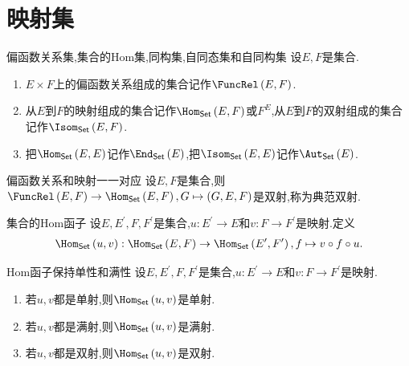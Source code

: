 \section{映射集}

\begin{definition}{偏函数关系集,集合的Hom集,同构集,自同态集和自同构集}{}
	设$E,F$是集合.
	\begin{enumerate}
		\item $E\times F$上的偏函数关系组成的集合记作$\FuncRel\left(E,F\right)$.
		\item 从$E$到$F$的映射组成的集合记作$\Hom_{\mathsf{Set}}\left(E,F\right)$或$F^{E}$,从$E$到$F$的双射组成的集合记作$\Isom_{\mathsf{Set}}\left(E,F\right)$.
		\item 把$\Hom_{\mathsf{Set}}\left(E,E\right)$记作$\End_{\mathsf{Set}}\left(E\right)$,把$\Isom_{\mathsf{Set}}\left(E,E\right)$记作$\Aut_{\mathsf{Set}}\left(E\right)$.
	\end{enumerate}
\end{definition}

\begin{proposition}{偏函数关系和映射一一对应}{}
	设$E,F$是集合,则$\FuncRel\left(E,F\right)\to\Hom_{\mathsf{Set}}\left(E,F\right),G\mapsto\left(G,E,F\right)$是双射,称为典范双射.
\end{proposition}

\begin{definition}{集合的Hom函子}{}
	设$E,E^{\prime},F,F^{\prime}$是集合,$u:E^{\prime}\to E$和$v:F\to F^{\prime}$是映射.定义$ $
	\begin{align*}
		\Hom_{\mathsf{Set}}\left(u,v\right):\Hom_{\mathsf{Set}}\left(E,F\right)\to\Hom_{\mathsf{Set}}\left(E^{\prime},F^{\prime}\right),f\mapsto v\circ f\circ u.
	\end{align*}
\end{definition}

\begin{proposition}{Hom函子保持单性和满性}{}
	设$E,E^{\prime},F,F^{\prime}$是集合,$u:E^{\prime}\to E$和$v:F\to F^{\prime}$是映射.
	\begin{enumerate}
		\item 若$u,v$都是单射,则$\Hom_{\mathsf{Set}}\left(u,v\right)$是单射.
		\item 若$u,v$都是满射,则$\Hom_{\mathsf{Set}}\left(u,v\right)$是满射.
		\item 若$u,v$都是双射,则$\Hom_{\mathsf{Set}}\left(u,v\right)$是双射.
	\end{enumerate}
\end{proposition}

